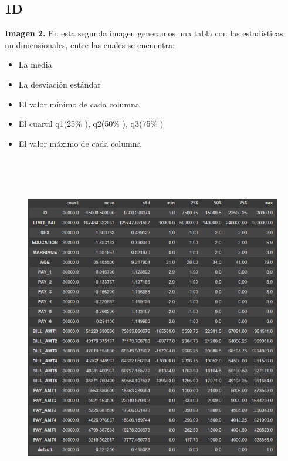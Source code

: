 \documentclass[12pt]{report}
\renewcommand{\_}{\kern-1.5pt\textunderscore\kern-1.5pt}
\begin{document}
\subsection{1D}
\textbf{Imagen 2.}
En esta segunda imagen generamos una tabla con las estadísticas unidimensionales, entre las cuales se encuentra:
\begin{itemize}
	\item La media
	\item La desviación estándar
	\item El valor mínimo de cada columna
	\item El cuartil q1(25$\%$ ), q2(50$\%$ ), q3(75$\%$ )
	\item El valor máximo de cada columna
\end{itemize}

\vspace{\baselineskip}



\begin{figure}[H]
	\begin{Center}
		\includegraphics[width=5.86in,height=6.04in]{./media/image1.png}
	\end{Center}
\end{figure}
\end{document}
